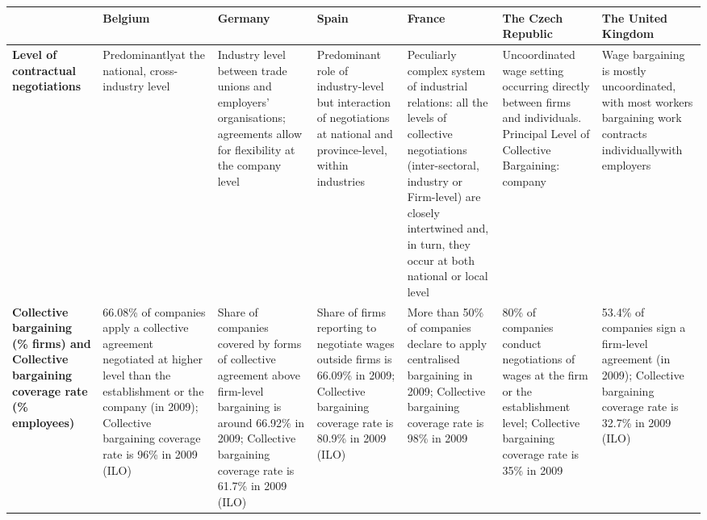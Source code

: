 

  \tiny
       \begin{tabular}{p{11.22em}p{12.28em}p{12.28em}p{12.28em}p{12.28em}p{12.28em}p{12.28em}}
    \toprule
    & \textbf{Belgium} & \textbf{Germany} & \textbf{Spain} & \textbf{France} & \textbf{The Czech Republic} & \textbf{The United Kingdom} \\
    \midrule
    \textbf{ Level of contractual negotiations} & Predominantly\newline{}at the national, cross-industry level & Industry level between  trade unions and employers' organisations; agreements allow for flexibility at the company level & Predominant role of industry-level but interaction of negotiations at national and province-level, within industries & Peculiarly complex system of industrial relations:  all the levels of collective negotiations (inter-sectoral, industry or Firm-level) are closely intertwined and, in turn, they occur at both national or local level & Uncoordinated wage setting occurring directly between  firms and individuals. Principal Level of Collective Bargaining: company & Wage bargaining is mostly uncoordinated, with most workers bargaining work contracts individually\newline{}with employers \\
    \midrule
    \textbf{Collective bargaining (\% firms) and Collective bargaining coverage rate (\% employees) } & 66.08\% of companies apply a collective agreement negotiated at higher level than the establishment or the company (in 2009); Collective bargaining coverage rate is 96\% in 2009 (ILO) &  Share of companies covered by forms of collective agreement above firm-level bargaining is around 66.92\% in 2009; Collective bargaining coverage rate is 61.7\% in 2009 (ILO) & Share of firms reporting to negotiate wages outside firms is 66.09\% in 2009; Collective bargaining coverage rate is 80.9\% in 2009 (ILO) & More than 50\% of companies declare to apply centralised bargaining in 2009; Collective bargaining coverage rate is 98\% in 2009 & 80\% of companies  conduct negotiations of wages at the firm or the establishment level; Collective bargaining coverage rate is 35\% in 2009 & 53.4\% of companies sign a firm-level agreement (in 2009); Collective bargaining coverage rate is 32.7\% in 2009 (ILO) \\
    \midrule

\end{tabular}
